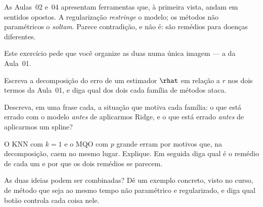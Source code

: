 As Aulas~02 e~04 apresentam ferramentas que, à primeira vista, andam em sentidos
opostos. A regularização \emph{restringe} o modelo; os métodos não paramétricos o
\emph{soltam}. Parece contradição, e não é: são remédios para doenças diferentes.

Este exercício pede que você organize as duas numa única imagem --- a da Aula~01.
\begin{itens}
  \item {} Escreva a decomposição do erro de um estimador $\rhat$ em
        relação a $r$ nos dois termos da Aula~01, e diga qual dos dois cada
        família de métodos ataca.
  \item {} Descreva, em uma frase cada, a situação que motiva cada família:
        o que está errado com o modelo \emph{antes} de aplicarmos Ridge, e o que
        está errado \emph{antes} de aplicarmos um spline?
  \item {} O KNN com $k=1$ e o MQO com $p$ grande erram por motivos que,
        na decomposição, caem no mesmo lugar. Explique. Em seguida diga qual é o
        remédio de cada um e por que os dois remédios se parecem.
  \item {} As duas ideias podem ser combinadas? Dê um exemplo concreto,
        visto no curso, de método que seja ao mesmo tempo não paramétrico e
        regularizado, e diga qual botão controla cada coisa nele.
\end{itens}

